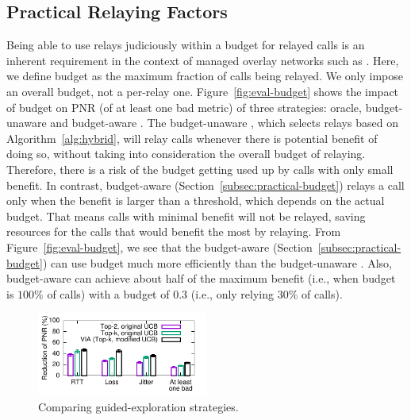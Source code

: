 
\subsection{Practical Relaying Factors}
\label{subsec:eval-parameter}



 Being able to use relays judiciously within a budget for relayed calls is an inherent requirement in the context of managed overlay networks such as \hybrid. 
Here, we define budget as the maximum fraction of calls being relayed. {We only impose an overall budget, not a per-relay one.}
Figure~\ref{fig:eval-budget} shows the impact of budget on PNR (of at least one bad metric) of three strategies: oracle, budget-unaware \hybrid and budget-aware \hybrid. The budget-unaware \hybrid, which selects relays based on Algorithm~\ref{alg:hybrid}, will relay calls whenever there is potential benefit of doing so, without taking into consideration the overall budget {of relaying}. Therefore, there is a risk of the budget getting used up by calls with only small benefit.
In contrast, budget-aware \hybrid (Section~\ref{subsec:practical-budget}) relays a call only when the benefit is larger than a threshold, which depends on the actual budget. That means calls with minimal benefit will not be relayed, saving resources for the calls that would benefit the most by relaying.
From Figure~\ref{fig:eval-budget}, we see that the budget-aware \hybrid (Section~\ref{subsec:practical-budget}) can use budget much more efficiently than the budget-unaware \hybrid. 
Also, budget-aware \hybrid can achieve about half of the maximum benefit (i.e., when budget is $100\%$ of calls) with a budget of $0.3$ (i.e., only relying $30\%$ of calls).%

\begin{figure}[t!]
\centering
\includegraphics[width=0.5\textwidth]{figures/Via-Eval-Bar-MinChoices-5-VIA-ComponentWise-PNR.pdf}
\caption{Comparing guided-exploration strategies.}
\label{fig:eval-component-ucb}
\end{figure}

